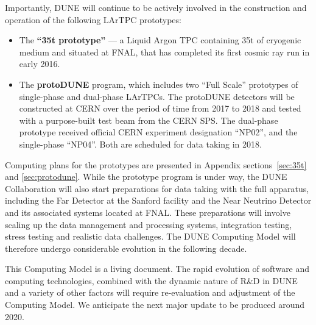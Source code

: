 Importantly, DUNE will continue to be actively involved in the construction and operation of the following LArTPC prototypes:
\begin{itemize}

\item The \textbf{``35t prototype''} --- a Liquid Argon TPC containing 35t of cryogenic medium and situated at FNAL,
that has completed its first cosmic ray run in early 2016.

\item The \textbf{protoDUNE} program, which includes two ``Full Scale'' prototypes of single-phase and dual-phase LArTPCs.
The protoDUNE detectors will be constructed at CERN over the period of time from 2017 to 2018 and tested with a purpose-built
test beam from the CERN SPS. The dual-phase prototype received official CERN experiment designation ``NP02'', and the single-phase ``NP04''.
Both are scheduled for  data taking in 2018.

\end{itemize}

\noindent
Computing plans for the prototypes are presented in Appendix sections~\ref{sec:35t} and \ref{sec:protodune}.
While the prototype program is under way, the DUNE Collaboration will also start preparations for data taking with the
full apparatus, including the Far Detector at the Sanford facility and the Near Neutrino Detector and its associated systems
located at FNAL.  These preparations will involve scaling up the data management and processing systems,
integration testing,  stress testing and realistic data challenges.
The DUNE Computing Model will therefore undergo considerable evolution in the following decade.

This Computing Model is a living document.
The rapid evolution of software and computing technologies, combined with the dynamic nature of R\&D in DUNE
and a variety of other factors will require re-evaluation and adjustment of the Computing Model. 
We anticipate the next major update to be produced around 2020.
